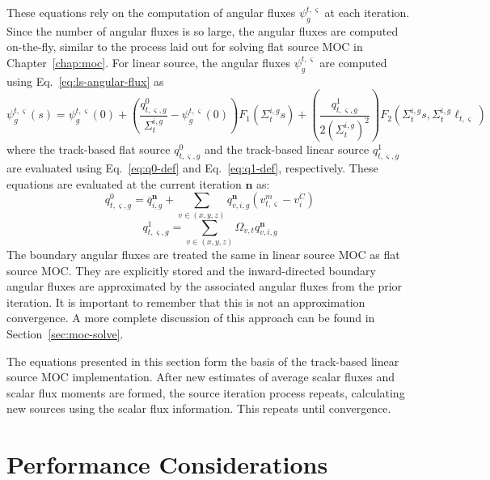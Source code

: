 These equations rely on the computation of angular fluxes $\psi_g^{t,\varsigma}$ at each iteration. Since the number of angular fluxes is so large, the angular fluxes are computed on-the-fly, similar to the process laid out for solving flat source \ac{MOC} in Chapter~\ref{chap:moc}. For linear source, the angular fluxes $\psi_g^{t,\varsigma}$ are computed using Eq.~\ref{eq:ls-angular-flux} as
\begin{equation*}
\psi_g^{t,\varsigma}(s) = \psi_g^{t,\varsigma}(0) + \left( \frac{q^0_{t,\varsigma,g}}{\Sigma_{t}^{i,g}} - \psi_g^{t,\varsigma}(0) \right) F_1\left(\Sigma_{t}^{i,g} s \right) + \left(\frac{q^1_{t,\varsigma,g}}{2\left(\Sigma_{t}^{i,g}\right)^2}\right) F_2\left(\Sigma_{t}^{i,g} s, \Sigma_{t}^{i,g} \ell_{t,\varsigma} \right)
\end{equation*}
where the track-based flat source $q^0_{t,\varsigma,g}$ and the track-based linear source $q^1_{t,\varsigma,g}$ are evaluated using Eq.~\ref{eq:q0-def} and Eq.~\ref{eq:q1-def}, respectively. These equations are evaluated at the current iteration $\mathbf{n}$ as:
\begin{equation}
q^0_{t,\varsigma,g} = \overline{q}_{i,g}^{\mathbf{n}} + \sum_{v \in (x,y,z)} q_{v,i,g}^{\mathbf{n}} \left( v^m_{t,\varsigma} - v^C_i \right)
\end{equation}
\begin{equation}
q^1_{t,\varsigma,g} = \sum_{v \in (x,y,z)} \Omega_{v,t} q_{v,i,g}^{\mathbf{n}}
\end{equation}
The boundary angular fluxes are treated the same in linear source \ac{MOC} as flat source \ac{MOC}. They are explicitly stored and the inward-directed boundary angular fluxes are approximated by the associated angular fluxes from the prior iteration. It is important to remember that this is not an approximation convergence. A more complete discussion of this approach can be found in Section~\ref{sec:moc-solve}.

The equations presented in this section form the basis of the track-based linear source \ac{MOC} implementation. After new estimates of average scalar fluxes and scalar flux moments are formed, the source iteration process repeats, calculating new sources using the scalar flux information. This repeats until convergence.

\section{Performance Considerations}
\label{sec:ls-performance}

